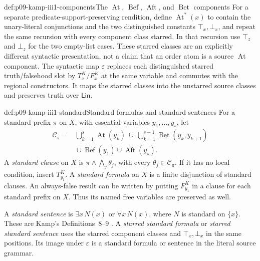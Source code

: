 \begin{hbdefinition}{def:p09-kamp-iii1-components}{The \(\operatorname{At}\), \(\operatorname{Bef}\), \(\operatorname{Aft}\), and \(\operatorname{Bet}\) components}
For a separate predicate-support-preserving rendition, define
\(\operatorname{At}^{*}(x)\) to contain the unary-literal conjunctions
and the two distinguished constants \(\top_x,\bot_x\), and repeat the
same recursion with every component class starred.  In that recursion use
\(\top_z\) and \(\bot_z\) for the two empty-list cases.  These
starred classes are an explicitly different syntactic presentation, not a
claim that an order atom is a source \(\operatorname{At}\) component.
The syntactic map \(\varepsilon\) replaces each distinguished starred
truth/falsehood slot by \(T^K_x/F^K_x\) at the same variable and commutes
with the regional constructors.  It maps the starred classes into the
unstarred source classes and preserves truth over \(\mathsf{Lin}\).
\end{hbdefinition}

\begin{hbdefinition}{def:p09-kamp-iii1-standard}{Standard formulas and standard sentences}
For a standard prefix \(\pi\) on \(X\), with essential variables
\(y_1,\ldots,y_s\), let
\[
\begin{split}
 \mathcal C_\pi={}&
 \bigcup_{k=1}^{s}\operatorname{At}(y_k)
 \ \cup\ \bigcup_{k=1}^{s-1}\operatorname{Bet}(y_k,y_{k+1})\\
 &{}\cup\operatorname{Bef}(y_1)\cup\operatorname{Aft}(y_s).
\end{split}
\]
A \emph{standard clause} on \(X\) is
\(\pi\land\bigwedge_j\theta_j\), with every
\(\theta_j\in\mathcal C_\pi\).  If it has no local condition, insert
\(T^K_{y_1}\).  A \emph{standard formula} on \(X\) is a finite
disjunction of standard clauses.  An always-false result can be written by
putting \(F^K_{y_1}\) in a clause for each standard prefix on \(X\).
Thus its named free variables are preserved as well.

A \emph{standard sentence} is \(\exists x\,N(x)\) or
\(\forall x\,N(x)\), where \(N\) is standard on \(\{x\}\).
These are Kamp's Definitions~8--9
\cite[ch.~III, pp.~48, 56]{Kamp1968}.  A \emph{starred standard formula}
or \emph{starred standard sentence} uses the starred component classes and
\(\top_x,\bot_x\) in the same positions.  Its image under
\(\varepsilon\) is a standard formula or sentence in the literal source
grammar.
\end{hbdefinition}

